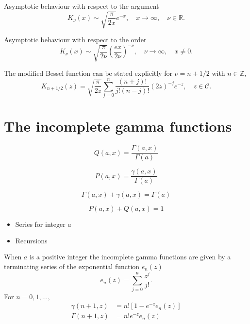 \documentclass[10pt,a4paper,oneside]{article}
\numberwithin{equation}{section}
\begin{document}
Asymptotic behaviour with respect to the argument
\begin{equation}\label{besselk_x_to_inf}
K_{\nu}(x) \sim \sqrt{\frac{\pi}{2x}} e^{-x}, \quad x \to \infty, \quad \nu \in \mathbb{R}.
\end{equation}

Asymptotic behaviour with respect to the order
\begin{equation}\label{besselk_order_to_inf}
K_{\nu}(x) \sim \sqrt{\frac{\pi}{2\nu}}\left(\frac{ex}{2\nu}\right)^{-\nu}, \quad \nu \to \infty, \quad x \neq 0.
\end{equation}

The modified Bessel function can be stated explicitly for $\nu = n + 1/2$ with $n \in \mathbb{Z}$,
\begin{equation}\label{besselk_half}
K_{n + 1/2}(z) = \sqrt{\frac{\pi}{2z}} \sum_{j=0}^n \frac{(n + j)!}{j! (n-j)!} (2z)^{-j}e^{-z}, \quad z\in \mathcal{C}.
\end{equation}

\section{The incomplete gamma functions}\label{appendix_incomplete_gamma}

\begin{equation}
Q(a, x) = \frac{\Gamma(a, x)}{\Gamma(a)}
\end{equation}

\begin{equation}
P(a, x) = \frac{\gamma(a, x)}{\Gamma(a)}
\end{equation}

\begin{equation}
\Gamma(a, x) + \gamma(a, x) = \Gamma(a)
\end{equation}

\begin{equation}
P(a, x) + Q(a, x) = 1
\end{equation}

\begin{itemize}
\item Series for integer $a$
\item Recursions
\end{itemize}


When $a$ is a positive integer the incomplete gamma functions are given by a terminating series of the exponential function $e_n(z)$ \cite[\S 11]{Temme1996}
\begin{equation}
e_n(z) = \sum_{j=0}^n \frac{z^j}{j!}.
\end{equation}
For $n =0,1,\ldots,$
\begin{align}
\gamma(n + 1, z) &= n! \left[1 - e^{-z} e_n(z)\right]\\
\Gamma(n + 1, z) &= n! e^{-z} e_n(z)
\end{align}



\end{document}
